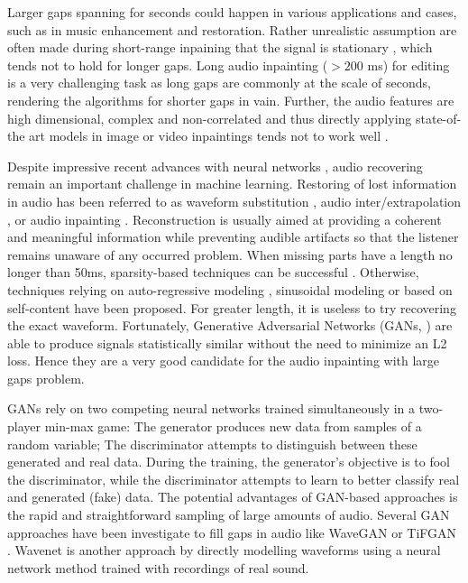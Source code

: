 \documentclass{article} %
\begin{document}
Larger gaps spanning for seconds could happen in various applications and cases, such as in music enhancement and restoration. Rather unrealistic assumption are often made during short-range inpaining that the signal is stationary \cite{perraudin2018}, which tends not to hold for longer gaps. Long audio inpainting ($>200$ ms) for editing is a very challenging task as long gaps are commonly at the scale of seconds, rendering the algorithms for shorter gaps in vain. Further, the audio features are high dimensional, complex and non-correlated and thus directly applying state-of-the art models in image or video inpaintings tends not to work well \cite{chang2019}.

Despite impressive recent advances with neural networks \cite{van2016wavenet, donahue2018wavegan}, audio recovering remain an important challenge in machine learning. Restoring of lost information in audio has been referred to as waveform substitution \cite{goodman1986}, audio inter/extrapolation \cite{kauppinen2001, etter1996}, or audio inpainting \cite{adler2012}. Reconstruction is usually aimed at providing a coherent and meaningful information while preventing audible artifacts so that the listener remains unaware of any occurred problem. When missing parts have a length no longer than 50ms, sparsity-based techniques can be successful \cite{adler2012, siedenburg2013}. Otherwise, techniques relying on auto-regressive modeling \cite{etter1996}, sinusoidal modeling \cite{lagrange2005, lukin2008} or based on self-content \cite{bahat2015} have been proposed. For greater length, it is useless to try recovering the exact waveform. Fortunately, Generative Adversarial Networks (GANs, \cite{goodfellow2014}) are able to produce signals statistically similar without the need to minimize an L2 loss. Hence they are a very good candidate for the audio inpainting with large gaps problem.

GANs rely on two competing neural networks trained simultaneously in a two-player min-max game: The generator produces new data from samples of a random variable; The discriminator attempts to distinguish between these generated and real data. During the training, the generator's objective is to fool the discriminator, while the discriminator attempts to learn to better classify real and generated (fake) data. The potential advantages of GAN-based approaches is the rapid and straightforward sampling of large amounts of audio. Several GAN approaches have been investigate to fill gaps in audio like WaveGAN \cite{donahue2018wavegan} or TiFGAN \cite{marafioti2019adversarial}. Wavenet \cite{van2016wavenet} is another approach by directly modelling waveforms using a neural network method trained with recordings of real sound.
\end{document}
